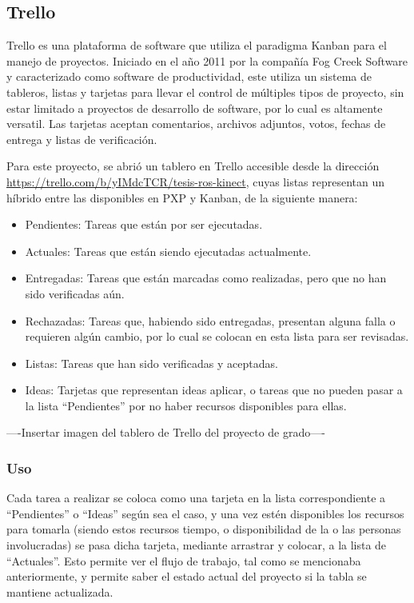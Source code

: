 \subsection{Trello}

Trello es una plataforma de software que utiliza el paradigma Kanban para el manejo de proyectos. Iniciado en el año 2011 por la compañía Fog Creek Software y caracterizado como software de productividad, este utiliza un sistema de tableros, listas y tarjetas para llevar el control de múltiples tipos de proyecto, sin estar limitado a proyectos de desarrollo de software, por lo cual es altamente versatil. Las tarjetas aceptan comentarios, archivos adjuntos, votos, fechas de entrega y listas de verificación.

Para este proyecto, se abrió un tablero en Trello accesible desde la dirección \url{https://trello.com/b/yIMdcTCR/tesis-ros-kinect}, cuyas listas representan un híbrido entre las disponibles en PXP y Kanban, de la siguiente manera:

\begin{itemize}
	\itemsep1pt \parskip1pt 
	\item Pendientes: Tareas que están por ser ejecutadas.
	\item Actuales: Tareas que están siendo ejecutadas actualmente.
	\item Entregadas: Tareas que están marcadas como realizadas, pero que no han sido verificadas aún.
	\item Rechazadas: Tareas que, habiendo sido entregadas, presentan alguna falla o requieren algún cambio, por lo cual se colocan en esta lista para ser revisadas.
	\item Listas: Tareas que han sido verificadas y aceptadas.
	\item Ideas: Tarjetas que representan ideas aplicar, o tareas que no pueden pasar a la lista ``Pendientes'' por no haber recursos disponibles para ellas.
\end{itemize}

----Insertar imagen del tablero de Trello del proyecto de grado----

\subsubsection{Uso}

Cada tarea a realizar se coloca como una tarjeta en la lista correspondiente a ``Pendientes'' o ``Ideas'' según sea el caso, y una vez estén disponibles los recursos para tomarla (siendo estos recursos tiempo, o disponibilidad de la o las personas involucradas) se pasa dicha tarjeta, mediante arrastrar y colocar, a la lista de ``Actuales''. Esto permite ver el flujo de trabajo, tal como se mencionaba anteriormente, y permite saber el estado actual del proyecto si la tabla se mantiene actualizada.
